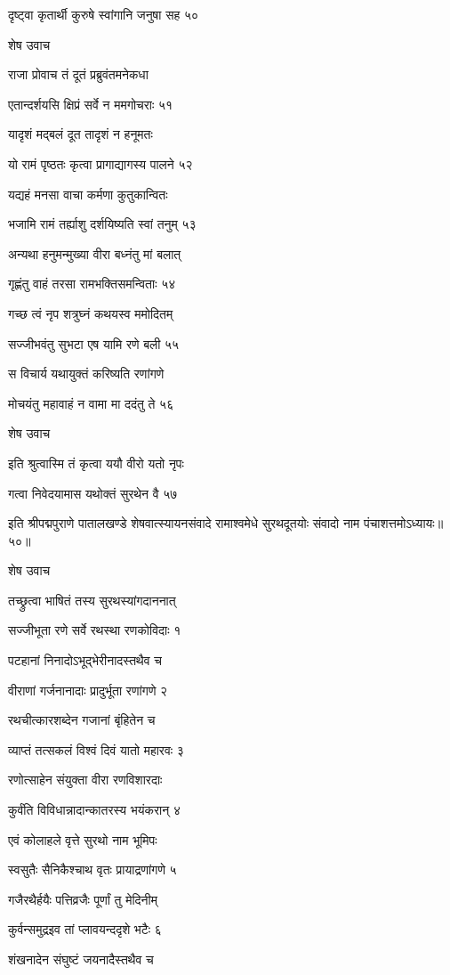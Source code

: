 दृष्ट्वा कृतार्थी कुरुषे स्वांगानि जनुषा सह ५०

शेष उवाच

राजा प्रोवाच तं दूतं प्रब्रुवंतमनेकधा

एतान्दर्शयसि क्षिप्रं सर्वे न ममगोचराः ५१

यादृशं मद्बलं दूत तादृशं न हनूमतः

यो रामं पृष्ठतः कृत्वा प्रागाद्यागस्य पालने ५२

यद्यहं मनसा वाचा कर्मणा कुतुकान्वितः

भजामि रामं तर्ह्याशु दर्शयिष्यति स्वां तनुम् ५३

अन्यथा हनुमन्मुख्या वीरा बध्नंतु मां बलात्

गृह्णंतु वाहं तरसा रामभक्तिसमन्विताः ५४

गच्छ त्वं नृप शत्रुघ्नं कथयस्व ममोदितम्

सज्जीभवंतु सुभटा एष यामि रणे बली ५५

स विचार्य यथायुक्तं करिष्यति रणांगणे

मोचयंतु महावाहं न वामा मा ददंतु ते ५६

शेष उवाच

इति श्रुत्वास्मि तं कृत्वा ययौ वीरो यतो नृपः

गत्वा निवेदयामास यथोक्तं सुरथेन वै ५७

इति श्रीपद्मपुराणे पातालखण्डे शेषवात्स्यायनसंवादे रामाश्वमेधे सुरथदूतयोः संवादो नाम पंचाशत्तमोऽध्यायः॥५०॥


शेष उवाच

तच्छ्रुत्वा भाषितं तस्य सुरथस्यांगदाननात्

सज्जीभूता रणे सर्वे रथस्था रणकोविदाः १

पटहानां निनादोऽभूद्भेरीनादस्तथैव च

वीराणां गर्जनानादाः प्रादुर्भूता रणांगणे २

रथचीत्कारशब्देन गजानां बृंहितेन च

व्याप्तं तत्सकलं विश्वं दिवं यातो महारवः ३

रणोत्साहेन संयुक्ता वीरा रणविशारदाः

कुर्वंति विविधान्नादान्कातरस्य भयंकरान् ४

एवं कोलाहले वृत्ते सुरथो नाम भूमिपः

स्वसुतैः सैनिकैश्चाथ वृतः प्रायाद्रणांगणे ५

गजैरथैर्हयैः पत्तिव्रजैः पूर्णां तु मेदिनीम्

कुर्वन्समुद्रइव तां प्लावयन्ददृशे भटैः ६

शंखनादेन संघुष्टं जयनादैस्तथैव च


